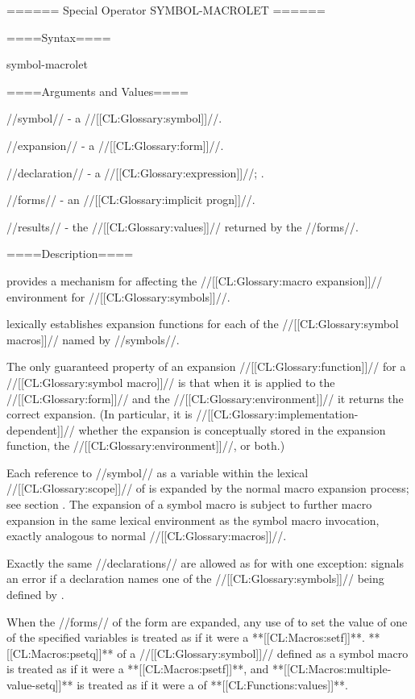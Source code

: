 ====== Special Operator SYMBOL-MACROLET ======



====Syntax====

\DefspecWithValuesNewline symbol-macrolet {  } {}

====Arguments and Values====

//symbol// - a //[[CL:Glossary:symbol]]//.

//expansion// - a //[[CL:Glossary:form]]//.

//declaration// - a  //[[CL:Glossary:expression]]//; \noeval.


//forms// - an //[[CL:Glossary:implicit progn]]//.

//results// - the //[[CL:Glossary:values]]// returned by the //forms//.

====Description====


 provides a mechanism for affecting the //[[CL:Glossary:macro expansion]]// environment for //[[CL:Glossary:symbols]]//.

 lexically establishes expansion functions for each of the //[[CL:Glossary:symbol macros]]// named by //symbols//.

The only guaranteed property of an expansion //[[CL:Glossary:function]]// for a //[[CL:Glossary:symbol macro]]// is that when it is applied to the //[[CL:Glossary:form]]// and the //[[CL:Glossary:environment]]// it returns the correct expansion. (In particular, it is //[[CL:Glossary:implementation-dependent]]// whether the expansion is conceptually stored in the expansion function, the //[[CL:Glossary:environment]]//, or both.)

Each reference to //symbol// as a variable within the lexical //[[CL:Glossary:scope]]// of  is expanded by the normal macro expansion process; see section {\secref\SymbolsAsForms}. The expansion of a symbol macro is subject to further macro expansion in the same lexical environment as the symbol macro invocation, exactly analogous to normal //[[CL:Glossary:macros]]//.

Exactly the same //declarations// are allowed as for  with one exception:  signals an error if a  declaration names one of the //[[CL:Glossary:symbols]]// being defined by .


When the //forms// of the  form are expanded, any use of  to set the value of one of the specified variables is treated as if it were a **[[CL:Macros:setf]]**. **[[CL:Macros:psetq]]** of a //[[CL:Glossary:symbol]]// defined as a symbol macro is treated as if it were a **[[CL:Macros:psetf]]**, and **[[CL:Macros:multiple-value-setq]]** is treated as if it were a  of **[[CL:Functions:values]]**.

